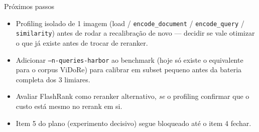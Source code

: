 \documentclass{beamer}
\begin{document}
\begin{frame}{Próximos passos}
  \begin{itemize}
    \item Profiling isolado de 1 imagem (load / \texttt{encode\_document} /
      \texttt{encode\_query} / \texttt{similarity}) antes de rodar a recalibração de
      novo — decidir se vale otimizar o que já existe antes de trocar de reranker.
    \item Adicionar \texttt{--n-queries-harbor} ao benchmark (hoje só existe o
      equivalente para o corpus ViDoRe) para calibrar em subset pequeno antes da
      bateria completa dos 3 limiares.
    \item Avaliar FlashRank como reranker alternativo, \emph{se} o profiling confirmar
      que o custo está mesmo no rerank em si.
    \item Item 5 do plano (experimento decisivo) segue bloqueado até o item 4 fechar.
  \end{itemize}
\end{frame}
\end{document}
